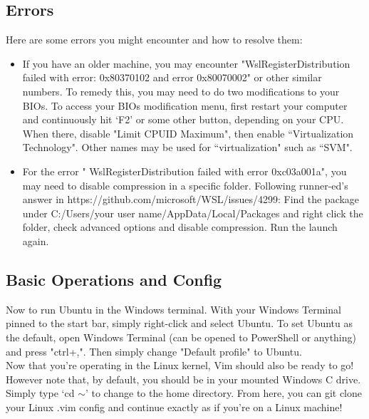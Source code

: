 \subsection{Errors}
Here are some errors you might encounter and how to resolve them:
\begin{itemize}
    \item If you have an older machine, you may encounter
        "WslRegisterDistribution failed with error: 0x80370102 and error
        0x80070002" or other similar numbers. To remedy this, you may need to do
        two modifications to your BIOs. To access your BIOs modification menu,
        first restart your computer and continuously hit `F2' or some other
        button, depending on your CPU. When there, disable
        "Limit CPUID Maximum", then enable ``Virtualization Technology".
        Other names may be used for ``virtualization" such as ``SVM".
    \item For the error " WslRegisterDistribution  failed with error
        0xc03a001a", you may need to disable compression in a specific folder.
        Following runner-ed's answer in
        https://github.com/microsoft/WSL/issues/4299: Find the package under
        C:/Users/\tlangle your user name\trangle/AppData/Local/Packages and right click the
        folder, check advanced options and disable compression. Run the launch
        again.
\end{itemize}

\subsection{Basic Operations and Config}
Now to run Ubuntu in the Windows terminal. With your Windows Terminal pinned to
the start bar, simply right-click and select Ubuntu. To set Ubuntu as the
default, open Windows Terminal (can be opened to PowerShell or anything) and
press "ctrl+,". Then simply change "Default profile" to Ubuntu.\\

Now that you're operating in the Linux kernel, Vim should also be ready to go!
However note that, by default, you should be in your mounted Windows C drive.
Simply type `cd $\sim$' to change to the home directory. From here, you can git
clone your Linux .vim config and continue exactly as if you're on a Linux
machine!\\


